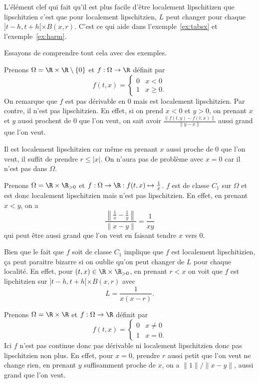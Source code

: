 L'élément clef qui fait qu'il est plus facile d'être localement lipschitizen
que lipschitzien c'est que pour localement lipschitzien, $L$ peut changer
pour chaque $]t-h,t+h[ \times B(x,r)$.
C'est ce qui aide dans l'exemple~\ref{ex:tabsx} et l'exemple~\ref{ex:harm}.

Essayons de comprendre tout cela avec des exemples.
\begin{myexem}
  \label{ex:ux}
  Prenons $\Omega = \R\times\R\setminus\{0\}$ et $f:\Omega\to\R$ définit par
  \[
    f(t,x) =
    \begin{cases}
      0 & x < 0\\
      1 & x \geq 0.
    \end{cases}
  \]
  On remarque que $f$ est pas dérivable en $0$ mais est localement
  lipschitzien.
  Par contre, il n'est pas lipschitzien.
  En effet, si on prend $x < 0$ et $y > 0$, on prenant $x$ et $y$ aussi
  prochent de $0$ que l'on veut,
  on sait avoir $\frac{\|f(t,y)-f(t,x)\|}{\|y-x\|}$
  aussi grand que l'on veut.

  Il est localement lipschitzien car même en prenant $x$
  aussi proche de $0$ que l'on veut,
  il suffit de prendre $r \leq |x|$.
  On n'aura pas de problème avec $x = 0$ car il n'est pas dans $\Omega$.
\end{myexem}
\begin{myexem}
  \label{ex:harm}
  Prenons $\Omega = \R\times\R_{>0}$ et
  $f:\Omega\to\R:f(t,x)\mapsto \frac{1}{x}$.
  $f$ est de classe $C_1$ sur $\Omega$ et est donc localement lipschitzien
  mais n'est pas lipschitzien.
  En effet, en prenant $x < y$, on a
  \[ \frac{\left\|\frac{1}{x}-\frac{1}{y}\right\|}{\|x-y\|} = \frac{1}{xy} \]
  qui peut être aussi grand que l'on veut en faisant tendre $x$ vers 0.

  Bien que le fait que $f$ soit de classe $C_1$ implique que $f$ est
  localement lipschitizien,
  ça peut paraitre bizarre si on oublie qu'on peut changer de $L$ pour
  chaque localité.
  En effet, pour $(t,x) \in \R\times\R_{>0}$,
  en prenant $r < x$
  on voit que $f$ est lipchitzien sur $]t-h,t+h[ \times B(x,r)$
  avec
  \[ L = \frac{1}{x(x-r)}. \]
\end{myexem}
\begin{myexem}
  Prenons $\Omega = \R\times\R$ et $f:\Omega\to\R$ définit par
  \[
    f(t,x) =
    \begin{cases}
      0 & x \neq 0\\
      1 & x = 0.
    \end{cases}
  \]
  Ici $f$ n'est pas continue donc pas dérivable ni localement lipschitzien
  donc pas lipschitzien non plus.
  En effet, pour $x = 0$, prendre $r$ aussi petit que l'on veut ne change rien,
  en prenant $y$ suffisamment proche de $x$, on a $\|1\|/\|x-y\|$,
  aussi grand que l'on veut.
\end{myexem}
